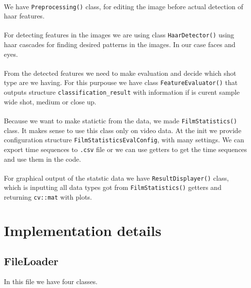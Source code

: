 \documentclass[english]{article}
\begin{document}
\paragraph{}
	We have \texttt{Preprocessing()} class, for editing the image before actual detection of haar features.
\paragraph{}
	For detecting features in the images we are using class \texttt{HaarDetector()} using haar cascades for finding desired 
	patterns in the images. In our case faces and eyes.
\paragraph{}
	From the detected features we need to make evaluation and decide which shot type are we having. For this purpouse we have
	class \texttt{FeatureEvaluator()} that outputs structure \texttt{classification\_result} with information if is curent sample
	wide shot, medium or close up.
\paragraph{}
	Because we want to make statictic from the data, we made \texttt{FilmStatistics()} class. It makes sense to use this class only on
	video data. At the init we provide configuration structure \texttt{FilmStatisticsEvalConfig}, with many settings. 
	We can export time sequences to \texttt{.csv} file or we can use getters to get the time sequences and use them in the code.
\paragraph{}
	For graphical output of the statstic data we have \texttt{ResultDisplayer()} class, which is inputting all data types got
	from \texttt{FilmStatistics()} getters and returning \texttt{cv::mat} with plots.

\section{Implementation details}

	\subsection{FileLoader}
		In this file we have four classes.
\end{document}

